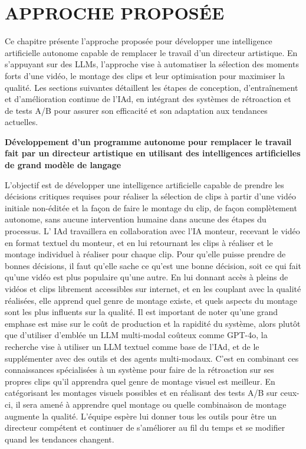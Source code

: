 \documentclass[livre]{udes-genie-these}
\begin{document}
\chapter{APPROCHE PROPOSÉE}

Ce chapitre présente l’approche proposée pour développer une intelligence artificielle autonome capable de remplacer le travail d’un directeur artistique. En s’appuyant sur des LLMs, l’approche vise à automatiser la sélection des moments forts d’une vidéo, le montage des clips et leur optimisation pour maximiser la qualité. Les sections suivantes détaillent les étapes de conception, d’entraînement et d’amélioration continue de l’IAd, en intégrant des systèmes de rétroaction et de tests A/B pour assurer son efficacité et son adaptation aux tendances actuelles.

\textbf{Développement d'un programme autonome pour remplacer le travail fait par un directeur artistique en utilisant des intelligences artificielles de grand modèle de langage}

L'objectif est de développer une intelligence artificielle capable de prendre les décisions critiques requises pour réaliser la sélection de clips à partir d'une vidéo initiale non-éditée et la façon de faire le montage du clip, de façon complètement autonome, sans aucune intervention humaine dans aucune des étapes du processus. L' IAd travaillera en collaboration avec l'IA monteur, recevant le vidéo en format textuel du monteur, et en lui retournant les clips à réaliser et le montage individuel à réaliser pour chaque clip.
Pour qu'elle puisse prendre de bonnes décisions, il faut qu'elle sache ce qu'est une bonne décision, soit ce qui fait qu'une vidéo est plus populaire qu'une autre. En lui donnant accès à pleins de vidéos et clips librement accessibles sur internet, et en les couplant avec la qualité réalisées, elle apprend quel genre de montage existe, et quels aspects du montage sont les plus influents sur la qualité. Il est important de noter qu'une grand emphase est mise sur le coût de production et la rapidité du système, alors plutôt que d'utiliser d'emblée un LLM multi-modal coûteux comme GPT-4o, la recherche vise à utiliser un LLM textuel comme base de l'IAd, et de le supplémenter avec des outils et des agents multi-modaux.
C'est en combinant ces connaissances spécialisées à un système pour faire de la rétroaction sur ses propres clips qu'il apprendra quel genre de montage visuel est meilleur. En catégorisant les montages visuels possibles et en réalisant des tests A/B sur ceux-ci, il sera amené à apprendre quel montage ou quelle combinaison de montage augmente la qualité. L'équipe espère lui donner tous les outils pour être un directeur compétent et continuer de s'améliorer au fil du temps et se modifier quand les tendances changent.
\end{document}
